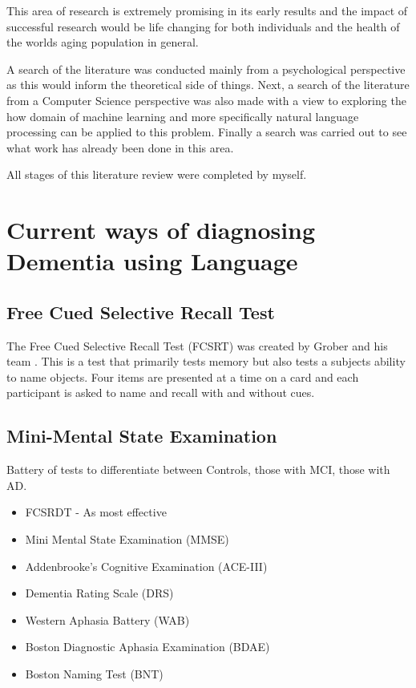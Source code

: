 \documentclass[a4paper]{article}
\begin{document}
\par
This area of research is extremely promising in its early results and the impact of successful research would be life changing for both individuals and the health of the worlds aging population in general. \newline
\par
A search of the literature was conducted mainly from a psychological perspective as this would inform the theoretical side of things. Next, a search of the literature from a Computer Science perspective was also made with a view to exploring the how domain of machine learning and more specifically natural language processing can be applied to this problem. Finally a search was carried out to see what work has already been done in this area.

All stages of this literature review were completed by myself. 


\section{Current ways of diagnosing Dementia using Language}
\subsection{Free Cued Selective Recall Test}
The Free Cued Selective Recall Test (FCSRT) was created by Grober and his team \cite{Grober1988}. This is a test that primarily tests memory but also tests a subjects ability to name objects. Four items are presented at a time on a card and each participant is asked to name and recall with and without cues. 

\subsection{Mini-Mental State Examination}

Battery of tests to differentiate between Controls, those with MCI, those with AD. 
\begin{itemize}
	\item FCSRDT - As most effective 
	\item Mini Mental State Examination (MMSE)
	\item Addenbrooke's Cognitive Examination (ACE-III)
	\item Dementia Rating Scale (DRS)
	\item Western Aphasia Battery (WAB)
	\item Boston Diagnostic Aphasia Examination (BDAE)
	\item Boston Naming Test (BNT)
\end{itemize}
\end{document}
